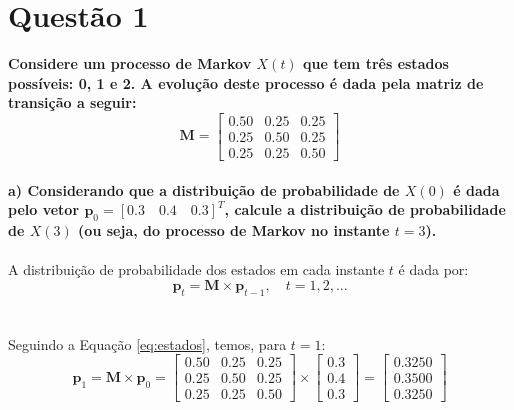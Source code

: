\documentclass{report}
\begin{document}


\section*{Questão 1}

\textbf{Considere um processo de Markov $X(t)$ que tem três estados possíveis: 0, 1 e 2. A evolução deste processo é dada pela matriz de transição a seguir:}\\

\begin{equation*}
\mathbf{M} = \left[ \begin{array}{ccc}
0.50 & 0.25 & 0.25 \\ 
0.25 & 0.50 & 0.25 \\ 
0.25 & 0.25 & 0.50 
\end{array} \right]
\end{equation*}\\

\textbf{a) Considerando que a distribuição de probabilidade de $X(0)$ é dada pelo vetor $\mathbf{p}_0 = [0.3 \quad 0.4 \quad 0.3]^T$, calcule a distribuição de probabilidade de $X(3)$ (ou seja, do processo de Markov no instante $t = 3$).}\\

\paragraph{} A distribuição de probabilidade dos estados em cada instante $t$ é dada por:\\

\begin{equation}\label{eq:estados}
\mathbf{p}_t = \mathbf{M} \times \mathbf{p}_{t-1}, \quad t = 1, 2, ...
\end{equation}\\

\paragraph{} Seguindo a Equação \eqref{eq:estados}, temos, para $t = 1$:\\

\begin{equation*}
\mathbf{p}_1 = \mathbf{M} \times \mathbf{p}_0 = \left[ \begin{array}{ccc}
0.50 & 0.25 & 0.25 \\ 
0.25 & 0.50 & 0.25 \\ 
0.25 & 0.25 & 0.50 
\end{array} \right] \times \left[\begin{array}{c}
0.3 \\ 
0.4 \\ 
0.3
\end{array} \right] = \left[ \begin{array}{c}
0.3250 \\ 
0.3500 \\ 
0.3250
\end{array}  \right]
\end{equation*}\\
\end{document}
